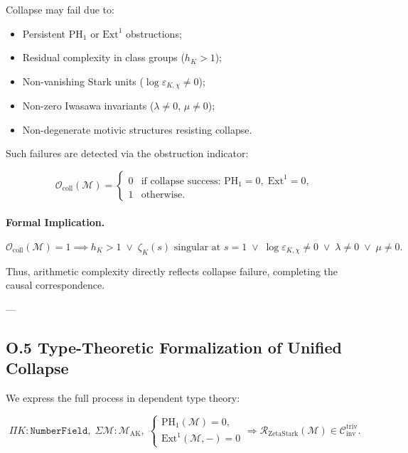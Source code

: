 \documentclass[11pt]{article}
\begin{document}
Collapse may fail due to:

\begin{itemize}
  \item Persistent \( \mathrm{PH}_1 \) or \( \mathrm{Ext}^1 \) obstructions;
  \item Residual complexity in class groups (\( h_K > 1 \));
  \item Non-vanishing Stark units (\( \log \varepsilon_{K,\chi} \neq 0 \));
  \item Non-zero Iwasawa invariants (\( \lambda \neq 0 \), \( \mu \neq 0 \));
  \item Non-degenerate motivic structures resisting collapse.
\end{itemize}

Such failures are detected via the obstruction indicator:

\[
\mathcal{O}_{\mathrm{coll}}(\mathcal{M}) =
\begin{cases}
0 & \text{if collapse success: } \mathrm{PH}_1 = 0,\; \mathrm{Ext}^1 = 0, \\
1 & \text{otherwise}.
\end{cases}
\]

\paragraph{Formal Implication.}
\[
\mathcal{O}_{\mathrm{coll}}(\mathcal{M}) = 1 \implies
h_K > 1 \;\lor\; \zeta_K(s) \text{ singular at } s = 1 \;\lor\; \log \varepsilon_{K,\chi} \neq 0 \;\lor\; \lambda \neq 0 \;\lor\; \mu \neq 0.
\]

Thus, arithmetic complexity directly reflects collapse failure, completing the causal correspondence.

---

\subsection*{O.5 Type-Theoretic Formalization of Unified Collapse}

We express the full process in dependent type theory:

\[
\Pi K : \texttt{NumberField}, \;
\Sigma \mathcal{M} : \mathcal{M}_{\mathrm{AK}}, \;
\begin{cases}
\mathrm{PH}_1(\mathcal{M}) = 0, \\
\mathrm{Ext}^1(\mathcal{M}, -) = 0
\end{cases}
\Rightarrow
\mathcal{R}_{\mathrm{ZetaStark}}(\mathcal{M}) \in \mathcal{C}_{\mathrm{inv}}^{\mathrm{triv}}.
\]
\end{document}
